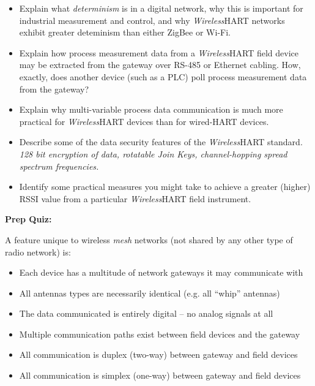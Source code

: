 \begin{itemize}
\item{} Explain what {\it determinism} is in a digital network, why this is important for industrial measurement and control, and why {\sl Wireless}HART networks exhibit greater deteminism than either ZigBee or Wi-Fi.
\item{} Explain how process measurement data from a {\sl Wireless}HART field device may be extracted from the gateway over RS-485 or Ethernet cabling.  How, exactly, does another device (such as a PLC) poll process measurement data from the gateway?
\item{} Explain why multi-variable process data communication is much more practical for {\sl Wireless}HART devices than for wired-HART devices.
\item{} Describe some of the data security features of the {\sl Wireless}HART standard. {\it 128 bit encryption of data, rotatable Join Keys, channel-hopping spread spectrum frequencies.}
\item{} Identify some practical measures you might take to achieve a greater (higher) RSSI value from a particular {\sl Wireless}HART field instrument.
\end{itemize}











\vfil \eject

\noindent
{\bf Prep Quiz:}

A feature unique to wireless {\it mesh} networks (not shared by any other type of radio network) is:

\begin{itemize}
\item{} Each device has a multitude of network gateways it may communicate with
\vskip 5pt 
\item{} All antennas types are necessarily identical (e.g. all ``whip'' antennas)
\vskip 5pt 
\item{} The data communicated is entirely digital -- no analog signals at all
\vskip 5pt 
\item{} Multiple communication paths exist between field devices and the gateway
\vskip 5pt 
\item{} All communication is duplex (two-way) between gateway and field devices 
\vskip 5pt 
\item{} All communication is simplex (one-way) between gateway and field devices
\end{itemize}





